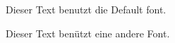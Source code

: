 \documentclass[a4paper]{article}
\begin{document}
Dieser Text benutzt die Default font.

{\selectfont
Dieser Text benützt eine andere Font.
}
\end{document}
